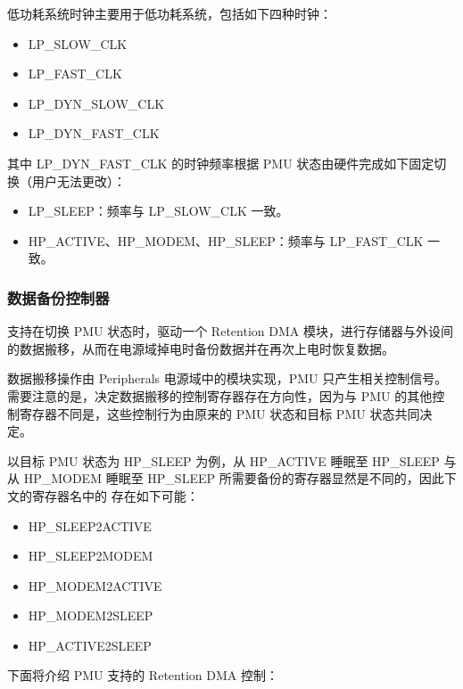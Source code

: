 \documentclass[main\_\_CN.tex]{subfiles}
\begin{document}
低功耗系统时钟主要用于低功耗系统，包括如下四种时钟：

    \begin{itemize}
    \item LP\_SLOW\_CLK
    \item LP\_FAST\_CLK
    \item LP\_DYN\_SLOW\_CLK
    \item LP\_DYN\_FAST\_CLK
    \end{itemize}

其中 LP\_DYN\_FAST\_CLK 的时钟频率根据 PMU 状态由硬件完成如下固定切换（用户无法更改）：

    \begin{itemize}
    \item LP\_SLEEP：频率与 LP\_SLOW\_CLK 一致。
    \item HP\_ACTIVE、HP\_MODEM、HP\_SLEEP：频率与 LP\_FAST\_CLK 一致。
    \end{itemize}

\subsubsection{数据备份控制器}

\chipname{} 支持在切换 PMU 状态时，驱动一个 Retention DMA 模块，进行存储器与外设间的数据搬移，从而在电源域掉电时备份数据并在再次上电时恢复数据。

数据搬移操作由 Peripherals 电源域中的模块实现，PMU 只产生相关控制信号。需要注意的是，决定数据搬移的控制寄存器存在方向性，因为与 PMU 的其他控制寄存器不同是，这些控制行为由原来的 PMU 状态和目标 PMU 状态共同决定。

以目标 PMU 状态为 HP\_SLEEP 为例，从 HP\_ACTIVE 睡眠至 HP\_SLEEP 与从 HP\_MODEM 睡眠至 HP\_SLEEP 所需要备份的寄存器显然是不同的，因此下文的寄存器名中的  存在如下可能：

\begin{itemize}
    \item HP\_SLEEP2ACTIVE
    \item HP\_SLEEP2MODEM
    \item HP\_MODEM2ACTIVE
    \item HP\_MODEM2SLEEP
    \item HP\_ACTIVE2SLEEP
\end{itemize}

下面将介绍 PMU 支持的 Retention DMA 控制：
\end{document}
